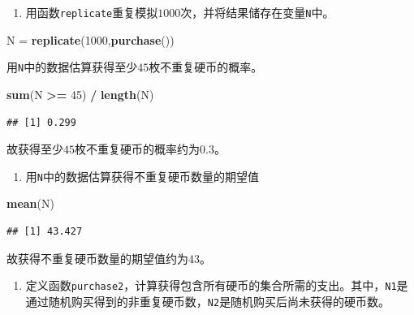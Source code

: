 \documentclass[]{article}
\newenvironment{Shaded}{\begin{snugshade}}{\end{snugshade}}
\newcommand{\DecValTok}[1]{\textcolor[rgb]{0.00,0.00,0.81}{#1}}
\newcommand{\KeywordTok}[1]{\textcolor[rgb]{0.13,0.29,0.53}{\textbf{#1}}}
\newcommand{\NormalTok}[1]{#1}
\newcommand{\OperatorTok}[1]{\textcolor[rgb]{0.81,0.36,0.00}{\textbf{#1}}}
\newcommand{\StringTok}[1]{\textcolor[rgb]{0.31,0.60,0.02}{#1}}
\providecommand{\tightlist}{%
  \setlength{\itemsep}{0pt}\setlength{\parskip}{0pt}}
\begin{document}
\begin{enumerate}
\def\labelenumi{\alph{enumi}.}
\setcounter{enumi}{1}
\tightlist
\item
  用函数\texttt{replicate}重复模拟\(1000\)次，并将结果储存在变量\texttt{N}中。
\end{enumerate}

\begin{Shaded}
\begin{Highlighting}[]
\NormalTok{N =}\StringTok{ }\KeywordTok{replicate}\NormalTok{(}\DecValTok{1000}\NormalTok{,}\KeywordTok{purchase}\NormalTok{())}
\end{Highlighting}
\end{Shaded}

用\texttt{N}中的数据估算获得至少\(45\)枚不重复硬币的概率。

\begin{Shaded}
\begin{Highlighting}[]
\KeywordTok{sum}\NormalTok{(N }\OperatorTok{>=}\StringTok{ }\DecValTok{45}\NormalTok{) }\OperatorTok{/}\StringTok{ }\KeywordTok{length}\NormalTok{(N)}
\end{Highlighting}
\end{Shaded}

\begin{verbatim}
## [1] 0.299
\end{verbatim}

故获得至少\(45\)枚不重复硬币的概率约为\(0.3\)。

\begin{enumerate}
\def\labelenumi{\alph{enumi}.}
\setcounter{enumi}{2}
\tightlist
\item
  用\texttt{N}中的数据估算获得不重复硬币数量的期望值
\end{enumerate}

\begin{Shaded}
\begin{Highlighting}[]
\KeywordTok{mean}\NormalTok{(N)}
\end{Highlighting}
\end{Shaded}

\begin{verbatim}
## [1] 43.427
\end{verbatim}

故获得不重复硬币数量的期望值约为\(43\)。

\begin{enumerate}
\def\labelenumi{\alph{enumi}.}
\setcounter{enumi}{3}
\tightlist
\item
  定义函数\texttt{purchase2}，计算获得包含所有硬币的集合所需的支出。其中，\texttt{N1}是通过随机购买得到的非重复硬币数，\texttt{N2}是随机购买后尚未获得的硬币数。
\end{enumerate}
\end{document}
